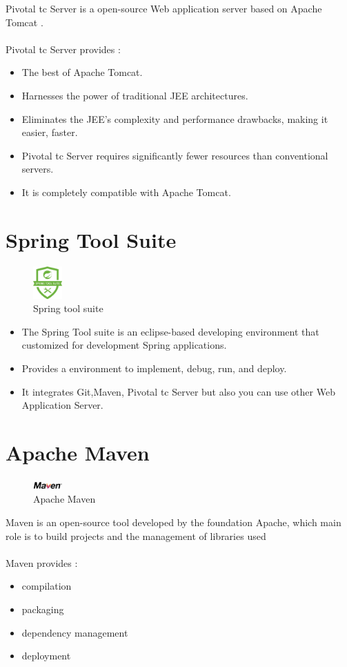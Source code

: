 Pivotal tc Server is a open-source Web application server based on Apache Tomcat \cite{ref11} .
\\
\\
Pivotal tc Server provides :
\begin{itemize}
	\item The best of Apache Tomcat.
	\item Harnesses the power of traditional JEE architectures.
	\item Eliminates the JEE's complexity and performance drawbacks, making it easier, faster.
	\item Pivotal tc Server requires significantly fewer resources than conventional servers.
	\item It is completely compatible with Apache Tomcat.
\end{itemize}



\section{Spring Tool Suite}

\begin{figure}[!h]
	
	\centering
	\includegraphics[width=0.1\textwidth]{spring-tool-suite-project-logo.png}
	\caption{Spring tool suite}
	\label{spring tool suite}
\end{figure}
\begin{itemize}
	\item The Spring Tool suite is an eclipse-based developing environment that customized for development  Spring applications.
	\item Provides a environment to implement, debug, run, and deploy.
	\item It integrates Git,Maven, Pivotal tc Server but also you can use other Web Application Server. 
\end{itemize}


\section{Apache Maven}
\begin{figure}[!h]
	\centering
	\includegraphics[width=0.1\textwidth]{Maven_logo.png}
	\caption{Apache Maven}
\end{figure}
Maven is an open-source tool developed by the foundation Apache, which main role is to build projects and the management of libraries used \cite{ref12}
\\
\\
Maven provides :
\begin{itemize}
	\item compilation
	\item packaging
	\item dependency management
	\item deployment
\end{itemize} 

